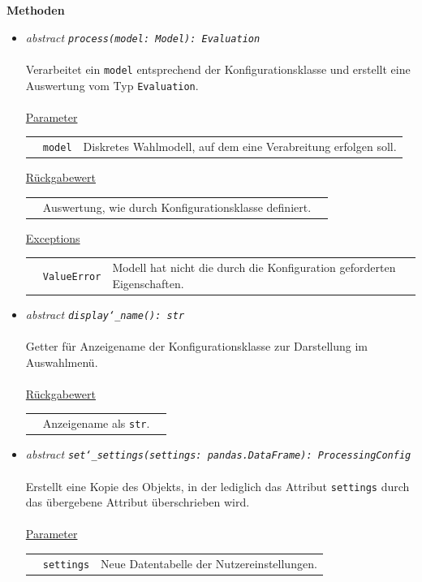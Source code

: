 \documentclass{article}
\begin{document}
\begin{itemize}
\textbf{Methoden}
\begin{itemize}\setlength\itemsep{3em}
\item \textit{\flqq{}abstract\frqq} \texttt{\textit{process(model: Model): Evaluation}}\\\\
Verarbeitet ein \texttt{model} entsprechend der Konfigurationsklasse und erstellt eine Auswertung vom Typ \texttt{Evaluation}.
\\\\
\underline{Parameter}\\
\begin{tabular}{lll}
 & \texttt{model} & Diskretes Wahlmodell, auf dem eine Verabreitung erfolgen soll.\\
\end{tabular}

\underline{Rückgabewert}\\
\begin{tabular}{lll}
 & Auswertung, wie durch Konfigurationsklasse definiert.\\
\end{tabular}

\underline{Exceptions}\\
\begin{tabular}{lll}
 & \texttt{ValueError} & Modell hat nicht die durch die Konfiguration geforderten Eigenschaften.\\
\end{tabular}

\item \textit{\flqq{}abstract\frqq} \texttt{\textit{display\char`_name(): str}}\\\\
Getter für Anzeigename der Konfigurationsklasse zur Darstellung im Auswahlmenü.
\\\\
\underline{Rückgabewert}\\
\begin{tabular}{lll}
 & Anzeigename als \texttt{str}.\\
\end{tabular}

\item \textit{\flqq{}abstract\frqq} \texttt{\textit{set\char`_settings(settings: pandas.DataFrame): ProcessingConfig}}\\\\
Erstellt eine Kopie des Objekts, in der lediglich das Attribut \texttt{settings} durch das übergebene Attribut überschrieben wird.
\\\\
\underline{Parameter}\\
\begin{tabular}{lll}
 & \texttt{settings} & Neue Datentabelle der Nutzereinstellungen.\\
\end{tabular}


\end{itemize}
\end{itemize}
\end{document}
